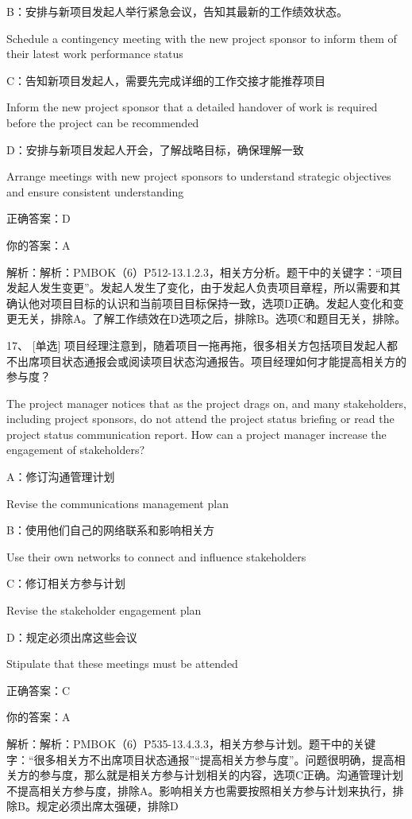 B：安排与新项目发起人举行紧急会议，告知其最新的工作绩效状态。

Schedule a contingency meeting with the new project sponsor to inform them of their latest work performance status

C：告知新项目发起人，需要先完成详细的工作交接才能推荐项目

Inform the new project sponsor that a detailed handover of work is required before the project can be recommended

D：安排与新项目发起人开会，了解战略目标，确保理解一致

Arrange meetings with new project sponsors to understand strategic objectives and ensure consistent understanding

正确答案：D

你的答案：A

解析：解析：PMBOK（6）P512-13.1.2.3，相关方分析。题干中的关键字：“项目发起人发生变更”。发起人发生了变化，由于发起人负责项目章程，所以需要和其确认他对项目目标的认识和当前项目目标保持一致，选项D正确。发起人变化和变更无关，排除A。了解工作绩效在D选项之后，排除B。选项C和题目无关，排除。

17、 [单选] 项目经理注意到，随着项目一拖再拖，很多相关方包括项目发起人都不出席项目状态通报会或阅读项目状态沟通报告。项目经理如何才能提高相关方的参与度？

The project manager notices that as the project drags on, and many stakeholders, including project sponsors, do not attend the project status briefing or read the project status communication report. How can a project manager increase the engagement of stakeholders?

A：修订沟通管理计划

Revise the communications management plan

B：使用他们自己的网络联系和影响相关方

Use their own networks to connect and influence stakeholders

C：修订相关方参与计划

Revise the stakeholder engagement plan

D：规定必须出席这些会议

Stipulate that these meetings must be attended

正确答案：C

你的答案：A

解析：解析：PMBOK（6）P535-13.4.3.3，相关方参与计划。题干中的关键字：“很多相关方不出席项目状态通报”“提高相关方参与度”。问题很明确，提高相关方的参与度，那么就是相关方参与计划相关的内容，选项C正确。沟通管理计划不提高相关方参与度，排除A。影响相关方也需要按照相关方参与计划来执行，排除B。规定必须出席太强硬，排除D

